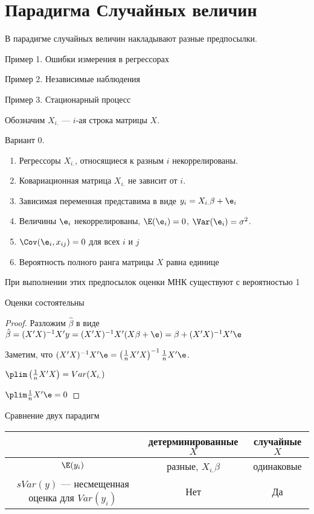 \documentclass[pdftex,12pt,a4paper]{article}
\def \hb{\hat{\beta}}
\begin{document}
\section{Парадигма Случайных величин}

В парадигме случайных величин накладывают разные предпосылки.


Пример 1. Ошибки измерения в регрессорах


Пример 2. Независимые наблюдения


Пример 3. Стационарный процесс




Обозначим $X_{i.}$ --- $i$-ая строка матрицы $X$.

Вариант 0.

\begin{enumerate}
\item Регрессоры $X_{i.}$, относящиеся к разным $i$ некоррелированы.
\item Ковариационная матрица $X_{i.}$ не зависит от $i$.
\item Зависимая переменная представима в виде $y_i=X_{i.}\beta+\e_i$
\item Величины $\e_i$ некоррелированы, $\E(\e_i)=0$, $\Var(\e_i)=\sigma^2$.
\item $\Cov(\e_i,x_{ij})=0$ для всех $i$ и $j$
\item Вероятность полного ранга матрицы $X$ равна единице
\end{enumerate}

При выполнении этих предпосылок оценки МНК существуют с вероятностью 1 

Оценки состоятельны
\begin{proof}
Разложим $\hb$ в виде $\hb=(X'X)^{-1}X'y=(X'X)^{-1}X'(X\beta+\e)=\beta+(X'X)^{-1}X'\e$

Заметим, что $(X'X)^{-1}X'\e=\left(\frac{1}{n}X'X\right)^{-1}\frac{1}{n}X'\e$.

$\plim \left(\frac{1}{n}X'X\right)=Var(X_{i.})$

$\plim \frac{1}{n}X'\e=0$
\end{proof}




Сравнение двух парадигм

\begin{tabular}{c|cc}
 & детерминированные $X$  & случайные $X$ \\ 
\hline 
$\E(y_i)$ & разные, $X_{i.}\beta$ & одинаковые \\ 
$sVar(y)$ --- несмещенная оценка для $Var(y_i)$ & Нет & Да \\
 
\end{tabular} 
\end{document}
